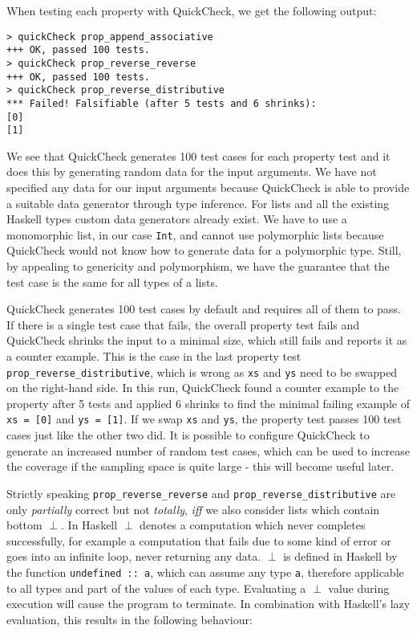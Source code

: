 When testing each property with QuickCheck, we get the following output:

\begin{verbatim}
> quickCheck prop_append_associative
+++ OK, passed 100 tests.
> quickCheck prop_reverse_reverse
+++ OK, passed 100 tests.
> quickCheck prop_reverse_distributive
*** Failed! Falsifiable (after 5 tests and 6 shrinks):    
[0]
[1]
\end{verbatim}

We see that QuickCheck generates 100 test cases for each property test and it does this by generating random data for the input arguments. We have not specified any data for our input arguments because QuickCheck is able to provide a suitable data generator through type inference. For lists and all the existing Haskell types custom data generators already exist. We have to use a monomorphic list, in our case \texttt{Int}, and cannot use polymorphic lists because QuickCheck would not know how to generate data for a polymorphic type. Still, by appealing to genericity and polymorphism, we have the guarantee that the test case is the same for all types of a lists.

QuickCheck generates 100 test cases by default and requires all of them to pass. If there is a single test case that fails, the overall property test fails and QuickCheck shrinks the input to a minimal size, which still fails and reports it as a counter example. This is the case in the last property test \texttt{prop\_reverse\_distributive}, which is wrong as \texttt{xs} and \texttt{ys} need to be swapped on the right-hand side. In this run, QuickCheck found a counter example to the property after 5 tests and applied 6 shrinks to find the minimal failing example of \texttt{xs = [0]} and \texttt{ys = [1]}. If we swap \texttt{xs} and \texttt{ys}, the property test passes 100 test cases just like the other two did. It is possible to configure QuickCheck to generate an increased number of random test cases, which can be used to increase the coverage if the sampling space is quite large - this will become useful later.

Strictly speaking \texttt{prop\_reverse\_reverse} and \texttt{prop\_reverse\_distributive} are only \textit{partially} correct but not \textit{totally}, \textit{iff} we also consider lists which contain bottom $\perp$. In Haskell $\perp$ denotes a computation which never completes successfully, for example a computation that fails due to some kind of error or goes into an infinite loop, never returning any data. $\perp$ is defined in Haskell by the function \texttt{undefined :: a}, which can assume any type \texttt{a}, therefore applicable to all types and part of the values of each type. Evaluating a $\perp$ value during execution will cause the program to terminate. In combination with Haskell's lazy evaluation, this results in the following behaviour:

